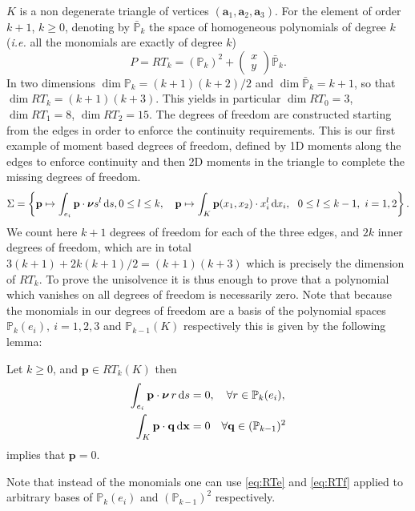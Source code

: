 $K$ is a non degenerate triangle of vertices $ (\mathbf{a}_1, \mathbf{a}_2, \mathbf{a}_3)$. For the element of order $k+1$, $k\geq 0$, denoting by $\bar{ \mathbb{P}}_k$ the space of homogeneous polynomials of degree $k$ (\textit{i.e.} all the monomials are exactly of degree $k$)
$$P = RT_k = (\mathbb{P}_k)^2 + 
\begin{pmatrix} x\\ y \end{pmatrix} \bar{ \mathbb{P}}_k.
$$
In two dimensions $\dim \mathbb{P}_k = (k+1)(k+2)/2$ and $\dim \bar{\mathbb{P}}_k = k+1$, so that
$\dim RT_k = (k+1)(k+3)$. This yields in particular $\dim RT_0= 3$, $\dim RT_1= 8$, $\dim RT_2= 15$.
The degrees of freedom are constructed starting from the edges in order to enforce the continuity requirements. This is our first example of moment based degrees of freedom, defined by 1D moments along the edges to enforce continuity and then 2D moments in the triangle to complete the missing degrees of freedom. 
$$\Sigma=\left\{ \mathbf{p}\mapsto\int_{e_i} \mathbf{p}\cdot \boldsymbol{\nu} s^l\,{\rm d} s, 0\leq l\leq k,~~~  
\mathbf{p}\mapsto\int_K \mathbf{p}(x_1,x_2) \cdot x_i^l \,{\rm d} x_i, ~~  0\leq l\leq k-1, ~i=1,2\right\}.  $$
We count here $k+1$ degrees of freedom for each of the three edges, and  $2k$ inner degrees of freedom,
which are in total $3(k+1)+ 2k(k+1)/2 = (k+1)(k+3)$ which is precisely the dimension of $RT_k$. To prove the unisolvence it is thus enough to prove that a polynomial which vanishes on all degrees of freedom is necessarily zero. Note that because the monomials in our degrees of freedom are a basis of the polynomial spaces
$ \mathbb{P}_k(e_i), ~i=1,2,3$ and  $ \mathbb{P}_{k-1}(K)$ respectively this is given by the following lemma:
\begin{lemma} Let $k\geq 0$, and $ \mathbf{p}\in RT_k(K)$ then
\begin{align}
\int_{e_i} \mathbf{p}\cdot \boldsymbol{\nu} \,r \,{\rm d} s &=0, \quad \forall r\in \mathbb{P}_k(e_i), \label{eq:RTe}\\
\int_K \mathbf{p}  \cdot \mathbf{q} \,{\rm d} \mathbf{x} &=0 \quad\forall \mathbf{q} \in (\mathbb{P}_{k-1})^2
\label{eq:RTf}
\end{align}
implies that $ \mathbf{p}=0$.
\end{lemma}

\begin{remark}
Note that instead of the monomials one can use \eqref{eq:RTe} and  \eqref{eq:RTf} applied to arbitrary bases of 
$\mathbb{P}_k(e_i)$ and $(\mathbb{P}_{k-1})^2$ respectively.
\end{remark}


